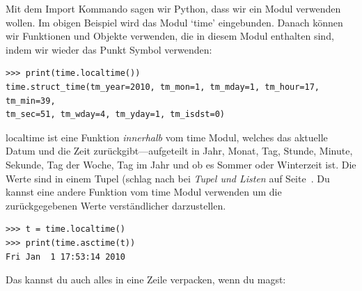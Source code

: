Mit dem Import Kommando sagen wir Python, dass wir ein Modul verwenden wollen. Im obigen Beispiel wird das Modul `time' eingebunden. Danach können wir Funktionen und Objekte verwenden, die in diesem Modul enthalten sind, indem wir wieder das Punkt Symbol verwenden:

\begin{Verbatim}[frame=single]
>>> print(time.localtime())
time.struct_time(tm_year=2010, tm_mon=1, tm_mday=1, tm_hour=17, tm_min=39, 
tm_sec=51, tm_wday=4, tm_yday=1, tm_isdst=0)
\end{Verbatim}

localtime ist eine Funktion \emph{innerhalb} vom time Modul, welches das aktuelle Datum und die Zeit zurückgibt---aufgeteilt in Jahr, Monat, Tag, Stunde, Minute, Sekunde, Tag der Woche, Tag im Jahr und ob es Sommer oder Winterzeit ist. Die Werte sind in einem Tupel (schlag nach bei \emph{Tupel und Listen} auf Seite~\pageref{tuplesandlists}. Du kannst eine andere Funktion vom time Modul verwenden um die zurückgegebenen Werte verständlicher darzustellen.

\begin{Verbatim}[frame=single]
>>> t = time.localtime()
>>> print(time.asctime(t))
Fri Jan  1 17:53:14 2010
\end{Verbatim}

\noindent
Das kannst du auch alles in eine Zeile verpacken, wenn du magst:

